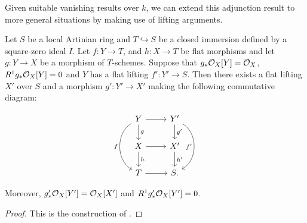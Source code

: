 	Given suitable vanishing results over $k$, we can extend this adjunction result to more general situations by making use of lifting arguments.
	
	\begin{proposition}\label{push-lift}
		Let $S$ be a local Artinian ring and $T \hookrightarrow S$ be a closed immersion defined by a square-zero ideal $I$.  Let $f\colon Y \to T$, and $h\colon X \to T$ be flat morphisms and let $g\colon Y \to X$ be a morphism of $T$-schemes. 
		Suppose that $g_{*} \mathcal{O}_{X}[Y]=\mathcal{O}_{X}$, $R^{1}g_{*} \mathcal{O}_{X}[Y] = 0$ and $Y$ has a flat lifting $f' \colon Y' \to S$. Then there exists a flat lifting $X'$ over $S$ and a morphism $g' \colon Y' \to X'$ making the following commutative diagram:
		
		\[\begin{tikzcd}
			Y \arrow[r] \arrow[d, "g"]  \arrow[bend right=60,swap, "f"]{dd}
			& Y' \arrow[d, "g'"] \arrow[bend left=60,swap, "f'"]{dd} \\
			X \arrow[d, "h"] \arrow[r] & X' \arrow[d, "h'"] \\
			T \arrow[r]                        & S    .                     
		\end{tikzcd}\]
		
		Moreover,  $g'_{*} \mathcal{O}_{X}[Y']=\mathcal{O}_{X}[X']$ and $R^{1}g'_{*} \mathcal{O}_{X}[Y'] = 0$.
	\end{proposition}
	
	\begin{proof}
		This is the construction of \cite[Theorem 3.1]{cynk2009small}.\end{proof} %
		
		
